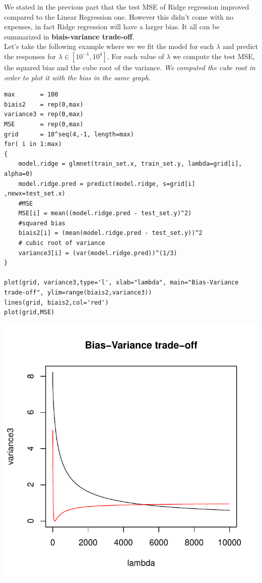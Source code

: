 \documentclass[]{report}
\begin{document}
We stated in the previous part that the test MSE of Ridge regression improved compared to the Linear Regression one.
However this didn't  come with no expenses, in fact Ridge regression will have a larger bias. It all can be summarized in\textbf{ biais-variance trade-off}.\\ 

Let's take the following example where we we fit the model for each $\lambda$ and predict the responses for $\lambda\in[10^{-1},10^{4}]$. For each value of $\lambda$ we compute the test MSE, the squared bias and the cube root of the variance. \textit{We computed the cube root in order to plot it with the bias in the same graph}.
\begin{lstlisting}
max       = 100
biais2    = rep(0,max)
variance3 = rep(0,max) 
MSE       = rep(0,max)
grid      = 10^seq(4,-1, length=max)
for( i in 1:max)
{     
	model.ridge = glmnet(train_set.x, train_set.y, lambda=grid[i], alpha=0)
	model.ridge.pred = predict(model.ridge, s=grid[i] ,newx=test_set.x)
	#MSE
	MSE[i] = mean((model.ridge.pred - test_set.y)^2) 
	#squared bias
	biais2[i] = (mean(model.ridge.pred - test_set.y))^2
	# cubic root of variance 
	variance3[i] = (var(model.ridge.pred))^(1/3) 
}

plot(grid, variance3,type='l', xlab="lambda", main="Bias-Variance trade-off", ylim=range(biais2,variance3))
lines(grid, biais2,col='red')
plot(grid,MSE)
\end{lstlisting}

\begin{center}
	\includegraphics[width=0.8\linewidth]{Figures/ridge_bias_var.pdf}
\end{center}
\end{document}

